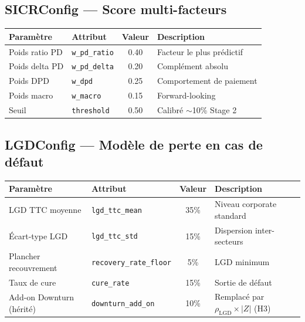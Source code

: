 \documentclass[12pt,a4paper]{article}
\begin{document}

\subsection{SICRConfig --- Score multi-facteurs}

\begin{center}
\begin{tabular}{llcl}
\toprule
\textbf{Param\`etre} & \textbf{Attribut} & \textbf{Valeur} & \textbf{Description} \\
\midrule
Poids ratio PD   & \texttt{w\_pd\_ratio} & 0.40 & Facteur le plus pr\'edictif \\
Poids delta PD   & \texttt{w\_pd\_delta} & 0.20 & Compl\'ement absolu \\
Poids DPD        & \texttt{w\_dpd}       & 0.25 & Comportement de paiement \\
Poids macro      & \texttt{w\_macro}     & 0.15 & Forward-looking \\
Seuil            & \texttt{threshold}    & 0.50 & Calibr\'e $\sim$10\% Stage 2 \\
\bottomrule
\end{tabular}
\end{center}

\subsection{LGDConfig --- Mod\`ele de perte en cas de d\'efaut}

\begin{center}
\begin{tabular}{llcl}
\toprule
\textbf{Param\`etre} & \textbf{Attribut} & \textbf{Valeur} & \textbf{Description} \\
\midrule
LGD TTC moyenne     & \texttt{lgd\_ttc\_mean}       & 35\% & Niveau corporate standard \\
\'Ecart-type LGD    & \texttt{lgd\_ttc\_std}        & 15\% & Dispersion inter-secteurs \\
Plancher recouvrement & \texttt{recovery\_rate\_floor} & 5\%  & LGD minimum \\
Taux de cure        & \texttt{cure\_rate}            & 15\% & Sortie de d\'efaut \\
Add-on Downturn (h\'erit\'e) & \texttt{downturn\_add\_on} & 10\% & Remplac\'e par $\rho_{\text{LGD}} \times |Z|$ (H3) \\
\bottomrule
\end{tabular}
\end{center}
\end{document}

